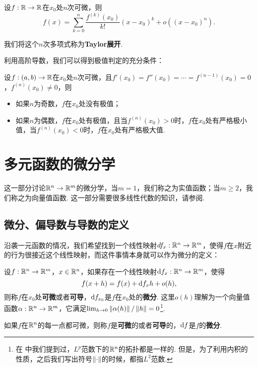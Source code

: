 \begin{theorem}
    设$f:\mathbb{R}\to\mathbb{R}$在$x_0$处$n$次可微，则
    \[
        f(x)=\sum_{k=0}^n\frac{f^{(k)}(x_0)}{k!}(x-x_0)^k+o((x-x_0)^n).
    \]
\end{theorem}
我们将这个$n$次多项式称为\textbf{Taylor展开}.

利用高阶导数，我们可以得到极值判定的充分条件：

\begin{theorem}\label{thm:extreme}
    设$f:(a,b)\to\mathbb{R}$在$x_0$处$n$次可微，且$f'(x_0)=f''(x_0)=\cdots=f^{(n-1)}(x_0)=0$，$f^{(n)}(x_0)\neq 0$，则
    \begin{itemize}
        \item 如果$n$为奇数，$f$在$x_0$处没有极值；
        \item 如果$n$为偶数，$f$在$x_0$处有极值，且当$f^{(n)}(x_0)>0$时，$f$在$x_0$处有严格极小值，当$f^{(n)}(x_0)<0$时，$f$在$x_0$处有严格极大值.
    \end{itemize}
\end{theorem}

\section{多元函数的微分学}

这一部分讨论$\mathbb{R}^n\to\mathbb{R}^m$的微分学，当$m=1$，我们称之为实值函数；当$m\geq 2$，我们称之为向量值函数. 这一部分需要很多线性代数的知识，请参阅.

\subsection{微分、偏导数与导数的定义}

沿袭一元函数的情况，我们希望找到一个线性映射$df_x:\mathbb{R}^n\to\mathbb{R}^m$，使得$f$在$x$附近的行为很接近这个线性映射，而这件事情本身就可以作为微分的定义：

\begin{definition}[微分]
    设$f:\mathbb{R}^n\to\mathbb{R}^m$，$x\in\mathbb{R}^n$，如果存在一个线性映射$\mathrm{d} f_{x}:\mathbb{R}^n\to\mathbb{R}^m$，使得
    \[
        f(x+h)=f(x)+\mathrm{d} f_{x}h+o(h),
    \]
    则称$f$在$x_0$处\textbf{可微}或者\textbf{可导}，$\mathrm{d} f_{x_0}$是$f$在$x_0$处的\textbf{微分}. 这里$o(h)$理解为一个向量值函数$\alpha:\mathbb{R}^n\to\mathbb{R}^m$，它满足$\lim_{h\to 0}\left\|\alpha(h)\right\|/\left\|h\right\|=0$\footnote{在 中我们提到过，$L^p$范数下的$\mathbb{R}^n$的拓扑都是一样的. 但是，为了利用内积的性质，之后我们写出符号$\left\|\cdot\right\|$的时候，都指$L^2$范数.}.

    如果$f$在$\mathbb{R}^n$的每一点都可微，则称$f$是\textbf{可微}的或者\textbf{可导}的，$\mathrm{d} f$是$f$的\textbf{微分}.
\end{definition}

